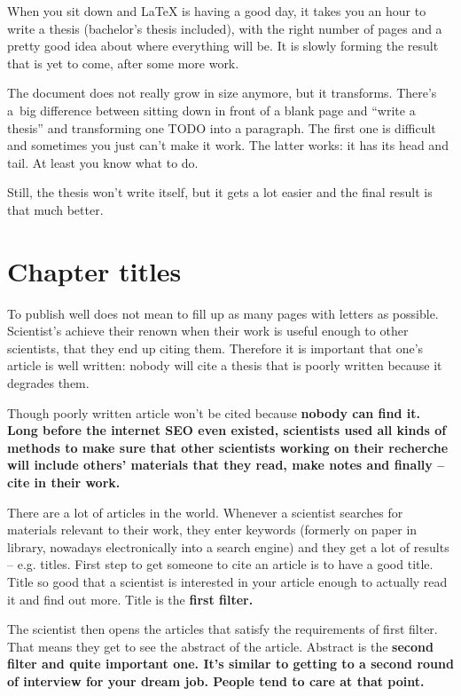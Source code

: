 When you sit down and LaTeX is having a good day, it takes you an hour to write a thesis (bachelor's thesis included), with the right number of pages and a pretty good idea about where everything will be. It is slowly forming the result that is yet to come, after some more work.

The document does not really grow in size anymore, but it transforms. There's a~big difference between sitting down in front of a blank page and ``write a thesis'' and transforming one TODO into a paragraph. The first one is difficult and sometimes you just can't make it work. The latter works: it has its head and tail. At least you know what to do.

Still, the thesis won't write itself, but it gets a lot easier and the final result is that much better.


\section{Chapter titles}

To publish well does not mean to fill up as many pages with letters as possible. Scientist's achieve their renown when their work is useful enough to other scientists, that they end up citing them. Therefore it is important that one's article is well written: nobody will cite a thesis that is poorly written because it degrades them.

Though poorly written article won't be cited because \bf nobody can find it\rm. Long before the internet SEO even existed, scientists used all kinds of methods to make sure that other scientists working on their recherche will include others' materials that they read, make notes and finally -- cite in their work.

There are a lot of articles in the world. Whenever a scientist searches for materials relevant to their work, they enter keywords (formerly on paper in library, nowadays electronically into a search engine) and they get a lot of results -- e.g. titles. First step to get someone to cite an article is to have a good title. Title so good that a scientist is interested in your article enough to actually read it and find out more. Title is the \bf first filter\rm.


The scientist then opens the articles that satisfy the requirements of first filter. That means they get to see the abstract of the article. Abstract is the \bf second filter \rm and quite important one. It's similar to getting to a second round of interview for your dream job. People tend to care at that point.

